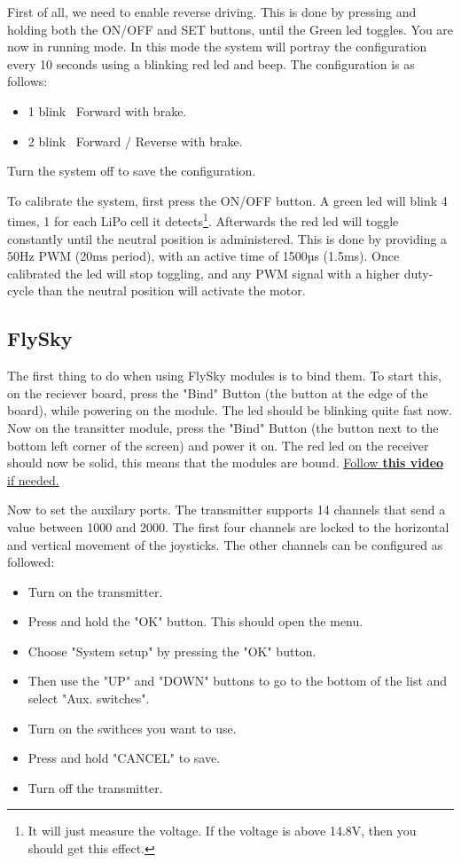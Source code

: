 \documentclass[ti,oneside,10pt]{uantwerpenreport}
\newcommand{\RmLstWS}[0]{\vspace{-6pt}} %
\begin{document}
First of all, we need to enable reverse driving.
This is done by pressing and holding both the ON/OFF and SET buttons, until the Green led toggles.
You are now in running mode.
In this mode the system will portray the configuration every 10 seconds using a blinking red led and beep.
The configuration is as follows:
\RmLstWS
\begin{itemize}
    \item 1 blink \rightarrow~Forward with brake.
    \item 2 blink \rightarrow~Forward / Reverse with brake.
\end{itemize}
\RmLstWS
Turn the system off to save the configuration.

To calibrate the system, first press the ON/OFF button.
A green led will blink 4 times, 1 for each LiPo cell it detects\footnote{It will just measure the voltage. If the voltage is above 14.8V, then you should get this effect.}.
Afterwards the red led will toggle constantly until the neutral position is administered.
This is done by providing a 50Hz PWM (20ms period), with an active time of 1500µs (1.5ms).
Once calibrated the led will stop toggling, and any PWM signal with a higher duty-cycle than the neutral position will activate the motor.
\subsection{FlySky}
The first thing to do when using FlySky modules is to bind them.
To start this, on the reciever board, press the "Bind" Button (the button at the edge of the board), while powering on the module.
The led should be blinking quite fast now.
Now on the transitter module, press the "Bind" Button (the button next to the bottom left corner of the screen) and power it on.
The red led on the receiver should now be solid, this means that the modules are bound.
\href{https://www.youtube.com/watch?v=q80QijmQzOI}{Follow \textbf{this video} if needed.}

Now to set the auxilary ports.
The transmitter supports 14 channels that send a value between 1000 and 2000.
The first four channels are locked to the horizontal and vertical movement of the joysticks.
The other channels can be configured as followed:
\RmLstWS
\begin{itemize}
    \item Turn on the transmitter.
    \item Press and hold the "OK" button.
          This should open the menu.
    \item Choose "System setup" by pressing the "OK" button.
    \item Then use the "UP" and "DOWN" buttons to go to the bottom of the list and select "Aux. switches".
    \item Turn on the swithces you want to use.
    \item Press and hold "CANCEL" to save.
    \item Turn off the transmitter.
\end{itemize}
\end{document}
